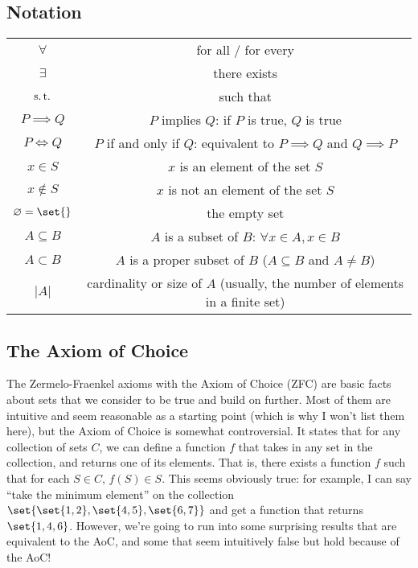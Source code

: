\documentclass[./analysis.tex]{subfiles}
\begin{document}
\subsection{Notation}
\begin{center}
    \begin{tabular}{cc}
        $\forall$ & for all / for every\\
        $\exists$ & there exists\\
        $\operatorname{s.t.}$ & such that\\
        $P \implies Q$ & $P$ implies $Q$: if $P$ is true, $Q$ is true\\
        $P \iff Q$ & $P$ if and only if $Q$: equivalent to $P \implies Q$ and $Q \implies P$\\
        $x \in S$ & $x$ is an element of the set $S$\\
        $x \not\in S$ & $x$ is not an element of the set $S$\\
        $\varnothing = \set{}$ & the empty set\\
        $A \subseteq B$ & $A$ is a subset of $B$: $\forall x \in A, x \in B$\\
        $A \subset B$ & $A$ is a proper subset of $B$ ($A \subseteq B$ and $A \neq B$)\\
        $|A|$ & cardinality or size of $A$ (usually, the number of elements in a finite set)
    \end{tabular}
\end{center}

\subsection{The Axiom of Choice}

The Zermelo-Fraenkel axioms with the Axiom of Choice (ZFC) are basic facts about sets that we consider to be true and build on further. Most of them are intuitive and seem reasonable as a starting point (which is why I won't list them here), but the Axiom of Choice is somewhat controversial. It states that for any collection of sets $C$, we can define a function $f$ that takes in any set in the collection, and returns one of its elements. That is, there exists a function $f$ such that for each $S \in C$, $f(S) \in S$. This seems obviously true: for example, I can say ``take the minimum element'' on the collection $\set{\set{1, 2}, \set{4, 5}, \set{6, 7}}$ and get a function that returns $\set{1, 4, 6}$. However, we're going to run into some surprising results that are equivalent to the AoC, and some that seem intuitively false but hold because of the AoC!
\end{document}
